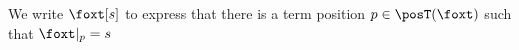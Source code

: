 We write $\foxt[s]$ to express that there is a term position $p\in\posT(\foxt)$ such that $\foxt|_p = s$ 